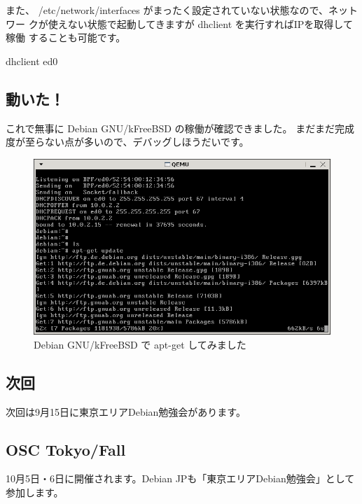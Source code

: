 \documentclass[mingoth,a4paper]{jsarticle}
\begin{document}
また、 /etc/network/interfaces がまったく設定されていない状態なので、ネットワー
クが使えない状態で起動してきますが dhclient を実行すればIPを取得して稼働
することも可能です。

\begin{commandline}
 dhclient ed0
\end{commandline}

\subsection{動いた！}

これで無事に Debian GNU/kFreeBSD の稼働が確認できました。
まだまだ完成度が至らない点が多いので、デバッグしほうだいです。

 \begin{figure}[H]
  \begin{center}
   \includegraphics[width=0.5\hsize]{image200708/kfreebsd-install-5.png}
  \end{center}
  \caption{Debian GNU/kFreeBSD で apt-get してみました}
  \label{fig:kfreebsdaptget}
 \end{figure}


\subsection{次回}
次回は9月15日に東京エリアDebian勉強会があります。

\subsection{OSC Tokyo/Fall}

10月5日・6日に開催されます。Debian JPも「東京エリアDebian勉強会」として
参加します。


\cleartooddpage
\end{document}
